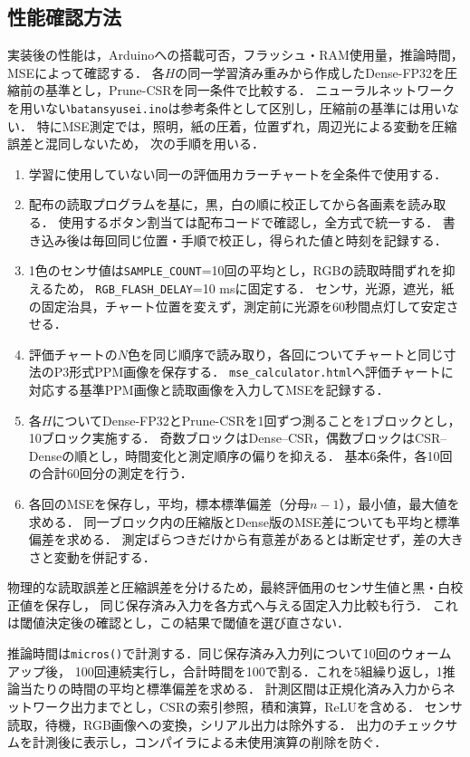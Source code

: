 \documentclass[a4paper,11pt]{article}
\begin{document}
\subsection{性能確認方法}

実装後の性能は，Arduinoへの搭載可否，フラッシュ・RAM使用量，推論時間，MSEによって確認する．
各$H$の同一学習済み重みから作成したDense-FP32を圧縮前の基準とし，Prune-CSRを同一条件で比較する．
ニューラルネットワークを用いない\texttt{batansyusei.ino}は参考条件として区別し，圧縮前の基準には用いない．
特にMSE測定では，照明，紙の圧着，位置ずれ，周辺光による変動を圧縮誤差と混同しないため，
次の手順を用いる．

\begin{enumerate}
  \item 学習に使用していない同一の評価用カラーチャートを全条件で使用する．
  \item 配布の読取プログラムを基に，黒，白の順に校正してから各画素を読み取る．
    使用するボタン割当ては配布コードで確認し，全方式で統一する．
    書き込み後は毎回同じ位置・手順で校正し，得られた値と時刻を記録する．
  \item 1色のセンサ値は\texttt{SAMPLE\_COUNT}=10回の平均とし，RGBの読取時間ずれを抑えるため，
    \texttt{RGB\_FLASH\_DELAY}=10 msに固定する．
    センサ，光源，遮光，紙の固定治具，チャート位置を変えず，測定前に光源を60秒間点灯して安定させる．
  \item 評価チャートの$N$色を同じ順序で読み取り，各回についてチャートと同じ寸法のP3形式PPM画像を保存する．
    \texttt{mse\_calculator.html}へ評価チャートに対応する基準PPM画像と読取画像を入力してMSEを記録する．
  \item 各$H$についてDense-FP32とPrune-CSRを1回ずつ測ることを1ブロックとし，10ブロック実施する．
    奇数ブロックはDense--CSR，偶数ブロックはCSR--Denseの順とし，時間変化と測定順序の偏りを抑える．
    基本6条件，各10回の合計60回分の測定を行う．
  \item 各回のMSEを保存し，平均，標本標準偏差（分母$n-1$），最小値，最大値を求める．
    同一ブロック内の圧縮版とDense版のMSE差についても平均と標準偏差を求める．
    測定ばらつきだけから有意差があるとは断定せず，差の大きさと変動を併記する．
\end{enumerate}

物理的な読取誤差と圧縮誤差を分けるため，最終評価用のセンサ生値と黒・白校正値を保存し，
同じ保存済み入力を各方式へ与える固定入力比較も行う．
これは閾値決定後の確認とし，この結果で閾値を選び直さない．

推論時間は\texttt{micros()}で計測する．同じ保存済み入力列について10回のウォームアップ後，
100回連続実行し，合計時間を100で割る．これを5組繰り返し，1推論当たりの時間の平均と標準偏差を求める．
計測区間は正規化済み入力からネットワーク出力までとし，CSRの索引参照，積和演算，ReLUを含める．
センサ読取，待機，RGB画像への変換，シリアル出力は除外する．
出力のチェックサムを計測後に表示し，コンパイラによる未使用演算の削除を防ぐ．
\end{document}
